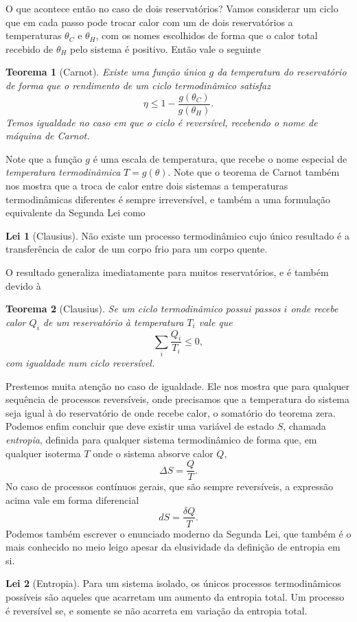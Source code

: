 \documentclass[a4paper, 12pt]{article}
\newtheorem{theorem}{Teorema}[section]
\theoremstyle{definition}
\theoremstyle{definition}
\newtheorem{law}{Lei}
\begin{document}
O que acontece então no caso de dois reservatórios? Vamos considerar um ciclo que em cada passo pode trocar 
calor com um de dois reservatórios a temperaturas $\theta_C$ e $\theta_H$, com os nomes escolhidos de forma 
que o calor total recebido de $\theta_H$ pelo sistema é positivo. Então vale o seguinte

\begin{theorem}[Carnot]
    Existe uma função única $g$ da temperatura do reservatório de forma que o rendimento de um ciclo 
    termodinâmico satisfaz
    $$\eta\leq1-\frac{g(\theta_C)}{g(\theta_H)}.$$
    Temos igualdade no caso em que o ciclo é reversível, recebendo o nome de máquina de Carnot.
\end{theorem}
Note que a função $g$ é uma escala de temperatura, que recebe o nome especial de \textit{temperatura
termodinâmica} $T=g(\theta)$. Note que o teorema de Carnot também nos mostra que a troca de calor
entre dois sistemas a temperaturas termodinâmicas diferentes é sempre irreversível, e também a uma 
formulação equivalente da Segunda Lei como

\setcounter{law}{1}
\begin{law}[Clausius]
    Não existe um processo termodinâmico cujo único resultado é a transferência de calor de um corpo frio
    para um corpo quente.
\end{law}

O resultado generaliza imediatamente para muitos reservatórios, e é também devido à
\begin{theorem}[Clausius]
    Se um ciclo termodinâmico possui passos $i$ onde recebe calor $Q_i$ de um reservatório à temperatura
    $T_i$ vale que
    $$\sum_i\frac{Q_i}{T_i}\leq0,$$
    com igualdade num ciclo reversível.
\end{theorem}

Prestemos muita atenção no caso de igualdade. Ele nos mostra que para qualquer sequência de processos
reversíveis, onde precisamos que a temperatura do sistema seja igual à do reservatório de onde recebe
calor, o somatório do teorema zera. Podemos enfim concluir que deve existir uma variável de estado $S$,
chamada \textit{entropia}, definida para qualquer sistema termodinâmico de forma que, em qualquer 
isoterma $T$ onde o sistema absorve calor $Q$,
$$\Delta S=\frac{Q}{T}.$$
No caso de processos contínuos gerais, que são sempre reversíveis, a expressão acima vale em forma 
diferencial
$$dS=\frac{\delta Q}{T}.$$
Podemos também escrever o enunciado moderno da Segunda Lei, que também é o mais conhecido no meio leigo apesar
da elusividade da definição de entropia em si.
\setcounter{law}{1}
\begin{law}[Entropia]
    Para um sistema isolado, os únicos processos termodinâmicos possíveis são aqueles que acarretam
    um aumento da entropia total. Um processo é reversível se, e somente se não acarreta em variação
    da entropia total.
\end{law}
\end{document}
